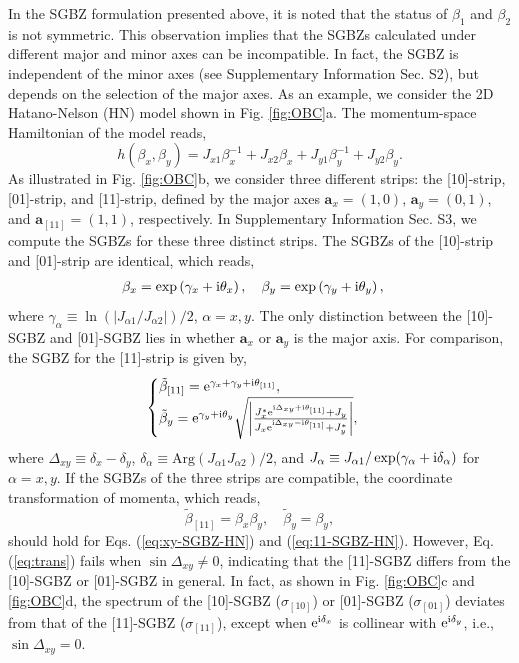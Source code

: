 In the SGBZ formulation presented above, it is noted that the status
of $\beta_{1}$ and $\beta_{2}$ is not symmetric. This observation
implies that the SGBZs calculated under different major and minor
axes can be incompatible. In fact, the SGBZ is independent of the
minor axes (see Supplementary Information Sec. S2), but depends on
the selection of the major axes. As an example, we consider the 2D
Hatano-Nelson (HN) model shown in Fig. \ref{fig:OBC}a. The momentum-space
Hamiltonian of the model reads, 
\begin{equation}
h\left(\beta_{x},\beta_{y}\right)=J_{x1}\beta_{x}^{-1}+J_{x2}\beta_{x}+J_{y1}\beta_{y}^{-1}+J_{y2}\beta_{y}.\label{eq:HN}
\end{equation}
As illustrated in Fig. \ref{fig:OBC}b, we consider three different
strips: the {[}10{]}-strip, {[}01{]}-strip, and {[}11{]}-strip, defined
by the major axes $\mathbf{a}_{x}=(1,0)$, $\mathbf{a}_{y}=(0,1)$,
and $\mathbf{a}_{[11]}=(1,1)$, respectively. In Supplementary Information
Sec. S3, we compute the SGBZs for these three distinct strips. The
SGBZs of the {[}10{]}-strip and {[}01{]}-strip are identical, which
reads, 
\begin{align}
\beta_{x} & =\exp\left(\gamma_{x}+\mathrm{i}\theta_{x}\right),\quad\beta_{y}=\exp\left(\gamma_{y}+\mathrm{i}\theta_{y}\right),\label{eq:xy-SGBZ-HN}
\end{align}
where $\gamma_{\alpha}\equiv\ln(|J_{\alpha1}/J_{\alpha2}|)/2$, $\alpha=x,y$.
The only distinction between the {[}10{]}-SGBZ and {[}01{]}-SGBZ lies
in whether $\mathbf{a}_{x}$ or $\mathbf{a}_{y}$ is the major axis.
For comparison, the SGBZ for the {[}11{]}-strip is given by, 
\begin{equation}
\begin{cases}
\tilde{\beta}_{[11]}=\mathrm{e}^{\gamma_{x}+\gamma_{y}+\mathrm{i}\theta_{[11]}},\\
\tilde{\beta}_{y}=\mathrm{e}^{\gamma_{y}+\mathrm{i}\theta_{y}}\sqrt{\left|\frac{J_{x}^{*}\mathrm{e}^{\mathrm{i}\Delta_{xy}+\mathrm{i}\theta_{[11]}}+J_{y}}{J_{x}\mathrm{e}^{\mathrm{i}\Delta_{xy}-\mathrm{i}\theta_{[11]}}+J_{y}^{*}}\right|},
\end{cases}\label{eq:11-SGBZ-HN}
\end{equation}
where $\Delta_{xy}\equiv\delta_{x}-\delta_{y}$, $\delta_{\alpha}\equiv\text{Arg}(J_{\alpha1}J_{\alpha2})/2$,
and $J_{\alpha}\equiv J_{\alpha1}/\exp(\gamma_{\alpha}+\mathrm{i}\delta_{\alpha})$
for $\alpha=x,y$. If the SGBZs of the three strips are compatible,
the coordinate transformation of momenta, which reads, 
\begin{equation}
\tilde{\beta}_{[11]}=\beta_{x}\beta_{y},\quad\tilde{\beta}_{y}=\beta_{y},\label{eq:trans}
\end{equation}
should hold for Eqs. (\ref{eq:xy-SGBZ-HN}) and (\ref{eq:11-SGBZ-HN}).
However, Eq. (\ref{eq:trans}) fails when $\sin\Delta_{xy}\neq0$,
indicating that the {[}11{]}-SGBZ differs from the {[}10{]}-SGBZ or
{[}01{]}-SGBZ in general. In fact, as shown in Fig. \ref{fig:OBC}c
and \ref{fig:OBC}d, the spectrum of the {[}10{]}-SGBZ ($\sigma_{[10]}$)
or {[}01{]}-SGBZ ($\sigma_{[01]}$) deviates from that of the {[}11{]}-SGBZ
($\sigma_{[11]}$), except when $\mathrm{e}^{\mathrm{i}\delta_{x}}$ is collinear
with $\mathrm{e}^{\mathrm{i}\delta_{y}}$, i.e., $\sin\Delta_{xy}=0$.


